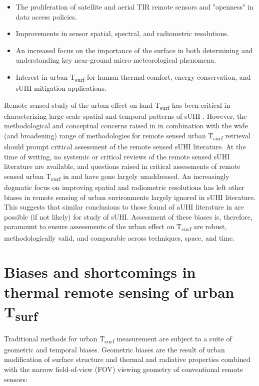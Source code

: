\begin{bibunit}
\begin{itemize}
	\item The proliferation of satellite and aerial TIR remote sensors and "openness" in data access policies.
	\item Improvements in sensor spatial, spectral, and radiometric resolutions. 
	\item An increased focus on the importance of the surface in both determining and understanding key near-ground micro-meteorological phenomena.
	\item Interest in urban T\textsubscript{surf} for human thermal comfort, energy conservation, and sUHI mitigation applications. 
\end{itemize}

Remote sensed study of the urban effect on land T\textsubscript{surf} has been critical in characterizing large-scale spatial and temporal patterns of sUHI \citep{Peng2012, Streutker2003, Imhoff2010}. However, the methodological and conceptual concerns raised in \citet{Stewart2011} in combination with the wide (and broadening) range of methodologies for remote sensed urban T\textsubscript{surf} retrieval should prompt critical assessment of the remote sensed sUHI literature. At the time of writing, no systemic or critical reviews of the remote sensed sUHI literature are available, and questions raised in critical assessments of remote sensed urban T\textsubscript{surf} in \cite{Roth1989} and \cite{Voogt2003} have gone largely unaddressed. An increasingly dogmatic focus on improving spatial and radiometric resolutions has left other biases in remote sensing of urban environments largely ignored in sUHI literature. This suggests that similar conclusions to those found of aUHI literature in \citet{Stewart2011} are possible (if not likely) for study of sUHI. Assessment of these biases is, therefore, paramount to ensure assessments of the urban effect on T\textsubscript{surf} are robust, methodologically valid, and comparable across techniques, space, and time.

\section{Biases and shortcomings in thermal remote sensing of urban T\textsubscript{surf}}

Traditional methods for urban T\textsubscript{surf} measurement are subject to a suite of geometric and temporal biases. Geometric biases are the result of urban modification of surface structure and thermal and radiative properties combined with the  narrow field-of-view (FOV) viewing geometry of conventional remote sensors:


\end{bibunit}
